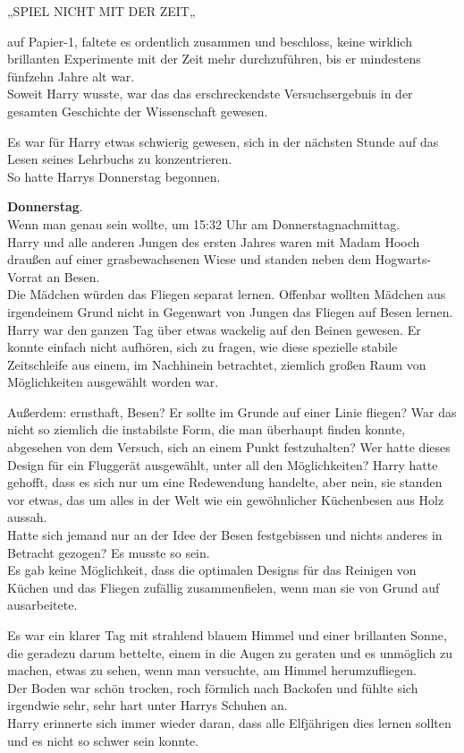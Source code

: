 {„SPIEL NICHT MIT DER ZEIT„

auf Papier-1, faltete es ordentlich zusammen und beschloss, keine wirklich brillanten Experimente mit der Zeit mehr durchzuführen, bis er mindestens fünfzehn Jahre alt war.\\ Soweit Harry wusste, war das das erschreckendste Versuchsergebnis in der gesamten Geschichte der Wissenschaft gewesen.

Es war für Harry etwas schwierig gewesen, sich in der nächsten Stunde auf das Lesen seines Lehrbuchs zu konzentrieren.\\ So hatte Harrys Donnerstag begonnen.

\textbf{Donnerstag}.\\ Wenn man genau sein wollte, um 15:32 Uhr am Donnerstagnachmittag.\\ Harry und alle anderen Jungen des ersten Jahres waren mit Madam Hooch draußen auf einer grasbewachsenen Wiese und standen neben dem Hogwarts-Vorrat an Besen.\\ Die Mädchen würden das Fliegen separat lernen. Offenbar wollten Mädchen aus irgendeinem Grund nicht in Gegenwart von Jungen das Fliegen auf Besen lernen.\\ Harry war den ganzen Tag über etwas wackelig auf den Beinen gewesen. Er konnte einfach nicht aufhören, sich zu fragen, wie diese spezielle stabile Zeitschleife aus einem, im Nachhinein betrachtet, ziemlich großen Raum von Möglichkeiten ausgewählt worden war.

Außerdem: ernsthaft, Besen? Er sollte im Grunde auf einer Linie fliegen? War das nicht so ziemlich die instabilste Form, die man überhaupt finden konnte, abgesehen von dem Versuch, sich an einem Punkt festzuhalten? Wer hatte dieses Design für ein Fluggerät ausgewählt, unter all den Möglichkeiten? Harry hatte gehofft, dass es sich nur um eine Redewendung handelte, aber nein, sie standen vor etwas, das um alles in der Welt wie ein gewöhnlicher Küchenbesen aus Holz aussah.\\ Hatte sich jemand nur an der Idee der Besen festgebissen und nichts anderes in Betracht gezogen? Es musste so sein.\\ Es gab keine Möglichkeit, dass die optimalen Designs für das Reinigen von Küchen und das Fliegen zufällig zusammenfielen, wenn man sie von Grund auf ausarbeitete.

Es war ein klarer Tag mit strahlend blauem Himmel und einer brillanten Sonne, die geradezu darum bettelte, einem in die Augen zu geraten und es unmöglich zu machen, etwas zu sehen, wenn man versuchte, am Himmel herumzufliegen.\\ Der Boden war schön trocken, roch förmlich nach Backofen und fühlte sich irgendwie sehr, sehr hart unter Harrys Schuhen an.\\ Harry erinnerte sich immer wieder daran, dass alle Elfjährigen dies lernen sollten und es nicht so schwer sein konnte.

}
